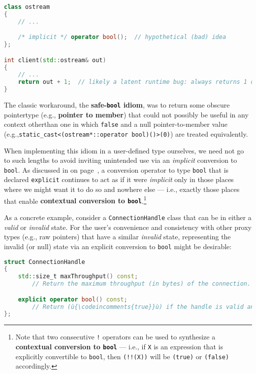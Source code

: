 \begin{lstlisting}[language=C++]
class ostream
{
    // ...

    /* implicit */ operator bool();  // hypothetical (bad) idea
};

int client(std::ostream& out)
{
    // ...
    return out + 1;  // likely a latent runtime bug: always returns 1 or 2
}
\end{lstlisting}
    
\noindent The classic workaround, the \textbf{safe-\texttt{bool} idiom},
was to return some obscure pointer\linebreak[4] %
 type (e.g., \textbf{pointer to
member}) that could not possibly be useful in any context other\linebreak[4] %
 than one in which \texttt{false} and a null pointer-to-member value (e.g.,\linebreak[4] %
\texttt{static\_cast<(ostream*::operator}~\texttt{bool)()>(0)}) are
treated equivalently.

When implementing this idiom in a user-defined type ourselves, we need not go to such lengths to avoid inviting unintended use
via an \emph{implicit} conversion to \texttt{bool}. As discussed in \textit{} on page~\pageref{description-explicitconv}, a conversion operator to type
\texttt{bool} that is declared \texttt{explicit} continues to act as if
it were \emph{implicit} only in those places where we might want it to
do so and nowhere else --- i.e., exactly those places that enable
\textbf{contextual conversion to \texttt{bool}}.{\cprotect\footnote{Note that two
consecutive \texttt{!} operators can be used to synthesize a
\textbf{contextual conversion to \texttt{bool}} --- i.e., if \texttt{X} is an
expression that is explicitly convertible to \texttt{bool}, then
\texttt{(!!(X))} will be \texttt{(true)} or \texttt{(false)}
  accordingly.}}

As a concrete example, consider a \texttt{ConnectionHandle} class that
can be in either a \emph{valid} or \emph{invalid} state. For the user's
convenience and consistency with other proxy types (e.g., raw pointers)
that have a similar \emph{invalid} state, representing the invalid (or null) state via an explicit conversion to
\texttt{bool} might be desirable:

\begin{lstlisting}[language=C++]
struct ConnectionHandle
{
    std::size_t maxThroughput() const;
        // Return the maximum throughput (in bytes) of the connection.

    explicit operator bool() const;
        // Return (ù{\codeincomments{true}}ù) if the handle is valid and (ù{\codeincomments{false}}ù) otherwise.
};
\end{lstlisting}
    
